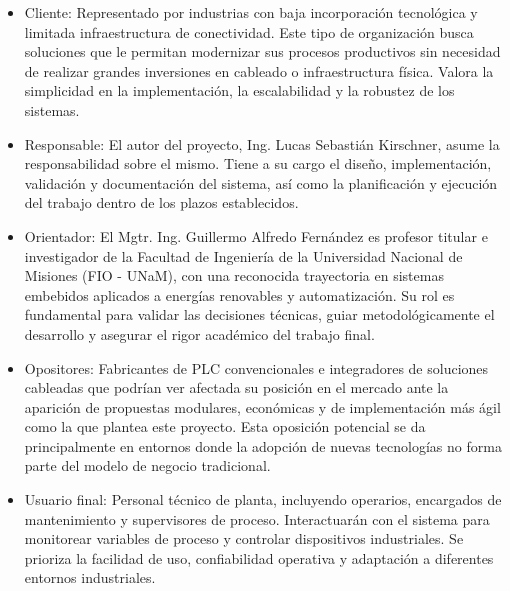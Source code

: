 \documentclass[
11pt, %
]{charter}
\begin{document}
\begin{itemize}
	\item Cliente: Representado por industrias con baja incorporación tecnológica y limitada infraestructura de conectividad. Este tipo de organización busca soluciones que le permitan modernizar sus procesos productivos sin necesidad de realizar grandes inversiones en cableado o infraestructura física. Valora la simplicidad en la implementación, la escalabilidad y la robustez de los sistemas.
	
	
	\item Responsable: El autor del proyecto, Ing. Lucas Sebastián Kirschner, asume la responsabilidad sobre el mismo. Tiene a su cargo el diseño, implementación, validación y documentación del sistema, así como la planificación y ejecución del trabajo dentro de los plazos establecidos.
	
	\item Orientador: El Mgtr. Ing. Guillermo Alfredo Fernández es profesor titular e investigador de la Facultad de Ingeniería de la Universidad Nacional de Misiones (FIO - UNaM), con una reconocida trayectoria en sistemas embebidos aplicados a energías renovables y automatización. Su rol es fundamental para validar las decisiones técnicas, guiar metodológicamente el desarrollo y asegurar el rigor académico del trabajo final.
	
	\item Opositores: Fabricantes de PLC convencionales e integradores de soluciones cableadas que podrían ver afectada su posición en el mercado ante la aparición de propuestas modulares, económicas y de implementación más ágil como la que plantea este proyecto. Esta oposición potencial se da principalmente en entornos donde la adopción de nuevas tecnologías no forma parte del modelo de negocio tradicional.
	
	\item Usuario final: Personal técnico de planta, incluyendo operarios, encargados de mantenimiento y supervisores de proceso. Interactuarán con el sistema para monitorear variables de proceso y controlar dispositivos industriales. Se prioriza la facilidad de uso, confiabilidad operativa y adaptación a diferentes entornos industriales.
\end{itemize}
\end{document}
